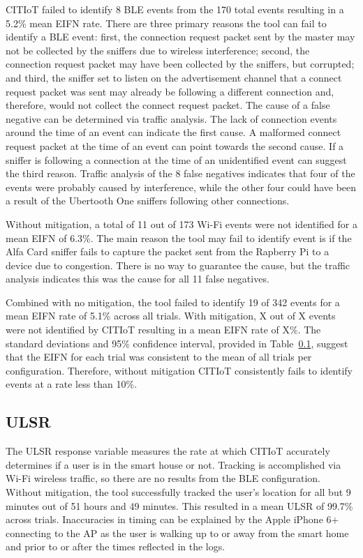 \documentclass[12pt,letterpaper,oneside]{book}
\begin{document}
	\ac{CITIoT} failed to identify 8 \ac{BLE} events from the 170 total events resulting in a 5.2\% mean \ac{EIFN} rate. There are three primary reasons the tool can fail to identify a \ac{BLE} event: first, the connection request packet sent by the master may not be collected by the sniffers due to wireless interference; second, the connection request packet may have been collected by the sniffers, but corrupted; and third, the sniffer set to listen on the advertisement channel that a connect request packet was sent may already be following a different connection and, therefore, would not collect the connect request packet. The cause of a false negative can be determined via traffic analysis. The lack of connection events around the time of an event can indicate the first cause. A malformed connect request packet at the time of an event can point towards the second cause. If a sniffer is following a connection at the time of an unidentified event can suggest the third reason. Traffic analysis of the 8 false negatives indicates that four of the events were probably caused by interference, while the other four could have been a result of the Ubertooth One sniffers following other connections.
	
	Without mitigation, a total of 11 out of 173 Wi-Fi events were not identified for a mean \ac{EIFN} of 6.3\%. The main reason the tool may fail to identify event is if the Alfa Card sniffer fails to capture the packet sent from the Rapberry Pi to a device due to congestion. There is no way to guarantee the cause, but the traffic analysis indicates this was the cause for all 11 false negatives.
	
	Combined with no mitigation, the tool failed to identify 19 of 342 events for a mean \ac{EIFN} rate of 5.1\% across all trials. With mitigation, X out of X events were not identified by \ac{CITIoT} resulting in a mean \ac{EIFN} rate of X\%. The standard deviations and 95\% confidence interval, provided in Table~\ref{}, suggest that the \ac{EIFN} for each trial was consistent to the mean of all trials per configuration. Therefore, without mitigation \ac{CITIoT} consistently fails to identify events at a rate less than 10\%. 
	
	
	\subsection{\ac{ULSR}}
	The \ac{ULSR} response variable measures the rate at which \ac{CITIoT} accurately determines if a user is in the smart house or not. Tracking is accomplished via Wi-Fi wireless traffic, so there are no results from the \ac{BLE} configuration. Without mitigation, the tool successfully tracked the user's location for all but 9 minutes out of 51 hours and 49 minutes. This resulted in a mean \ac{ULSR} of 99.7\% across trials. Inaccuracies in timing can be explained by the Apple iPhone 6+ connecting to the \ac{AP} as the user is walking up to or away from the smart home and prior to or after the times reflected in the logs.
	
\end{document}
